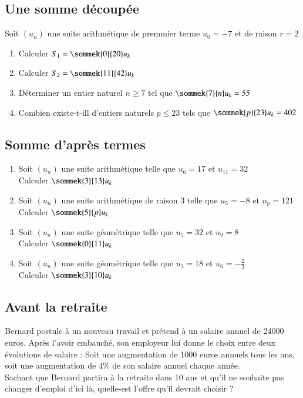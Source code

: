 \documentclass[oneside,12pt]{article}          %
\begin{document}
\subsection{Une somme découpée}
Soit $(u_n)$ une suite arithmétique de premmier terme $u_0=-7$ et de raison $r=2$
\begin{enumerate}
    \item Calculer $S_1=\sommek{0}{20}u_k$
    \item Calculer $S_2=\sommek{11}{42}u_k$
    \item Déterminer un entier naturel $n\geq7$ tel que $\sommek{7}{n}u_k=55$
    \item Combien existe-t-ill d'entiers naturels $p\leq23$ tels que $\sommek{p}{23}u_k=402$
\end{enumerate}



\subsection{Somme d'après termes}
\begin{enumerate}
	\item Soit $(u_n)$ une suite arithmétique telle que $u_6=17$ et $u_{11}=32$\\
	Calculer $\sommek{3}{13}u_k$
	\item Soit $(u_n)$ une suite arithmétique de raison 3 telle que $u_5=-8$ et $u_p=121$ \\
	Calculer $\sommek{5}{p}u_k$
	\item Soit $(u_n)$ une suite géométrique telle que $u_5=32$ et $u_9=8$ \\
	Calculer $\sommek{0}{11}u_k$
	\item Soit $(u_n)$ une suite géométrique telle que $u_3=18$ et $u_6=-\frac{2}{3}$ \\
	Calculer $\sommek{3}{10}u_k$
\end{enumerate}



\subsection{Avant la retraite}
Bernard postule à un nouveau travail et prétend à un salaire annuel de 24000 euros. Après l'avoir embauché, son employeur lui donne le choix entre deux évolutions de salaire : Soit une augmentation de 1000 euros annuels tous les ans, soit une augmentation de 4$\%$ de son salaire annuel chaque année. \\
Sachant que Bernard partira à la retraite dans 10 ans et qu'il ne souhaite pas changer d'emploi d'ici là, quelle-est l'offre qu'il devrait choisir ?
\end{document}
